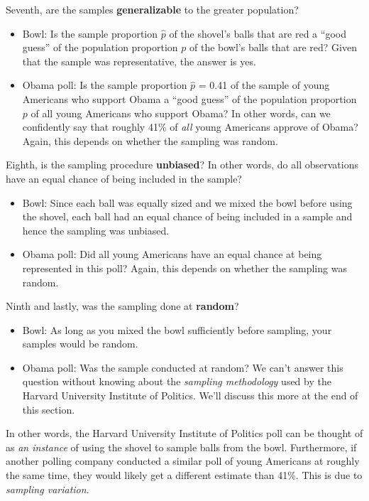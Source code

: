\documentclass[
]{book}
\providecommand{\tightlist}{%
  \setlength{\itemsep}{0pt}\setlength{\parskip}{0pt}}
\begin{document}
Seventh, are the samples \textbf{generalizable} to the greater population? 

\begin{itemize}
\tightlist
\item
  Bowl: Is the sample proportion \(\widehat{p}\) of the shovel's balls that are red a ``good guess'' of the population proportion \(p\) of the bowl's balls that are red? Given that the sample was representative, the answer is yes.
\item
  Obama poll: Is the sample proportion \(\widehat{p}\) = 0.41 of the sample of young Americans who support Obama a ``good guess'' of the population proportion \(p\) of all young Americans who support Obama? In other words, can we confidently say that roughly 41\% of \emph{all} young Americans approve of Obama? Again, this depends on whether the sampling was random.
\end{itemize}

Eighth, is the sampling procedure \textbf{unbiased}? In other words, do all observations have an equal chance of being included in the sample? 

\begin{itemize}
\tightlist
\item
  Bowl: Since each ball was equally sized and we mixed the bowl before using the shovel, each ball had an equal chance of being included in a sample and hence the sampling was unbiased.
\item
  Obama poll: Did all young Americans have an equal chance at being represented in this poll? Again, this depends on whether the sampling was random.
\end{itemize}

Ninth and lastly, was the sampling done at \textbf{random}? 

\begin{itemize}
\tightlist
\item
  Bowl: As long as you mixed the bowl sufficiently before sampling, your samples would be random.
\item
  Obama poll: Was the sample conducted at random? We can't answer this question without knowing about the \emph{sampling methodology} used by the Harvard University Institute of Politics. We'll discuss this more at the end of this section.
\end{itemize}

In other words, the Harvard University Institute of Politics poll can be thought of as \emph{an instance} of using the shovel to sample balls from the bowl. Furthermore, if another polling company conducted a similar poll of young Americans at roughly the same time, they would likely get a different estimate than 41\%. This is due to \emph{sampling variation}.
\end{document}
